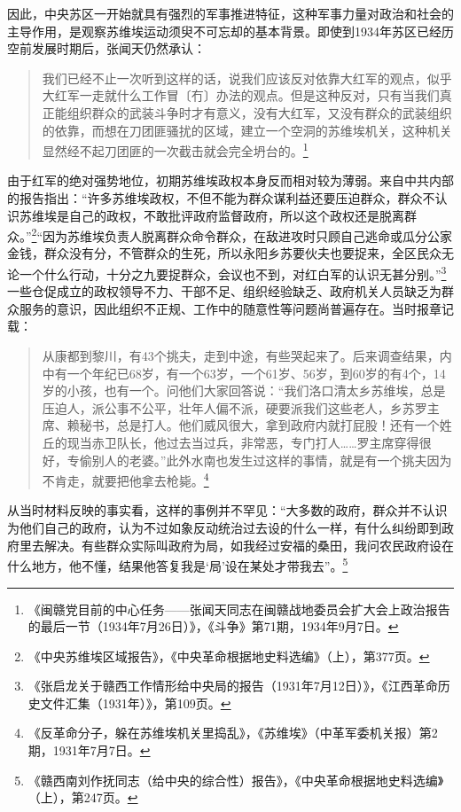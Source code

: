 因此，中央苏区一开始就具有强烈的军事推进特征，这种军事力量对政治和社会的主导作用，是观察苏维埃运动须臾不可忘却的基本背景。即使到1934年苏区已经历空前发展时期后，张闻天仍然承认：

\begin{quote}

我们已经不止一次听到这样的话，说我们应该反对依靠大红军的观点，似乎大红军一走就什么工作冒〔冇〕办法的观点。但是这种反对，只有当我们真正能组织群众的武装斗争时才有意义，没有大红军，又没有群众的武装组织的依靠，而想在刀团匪骚扰的区域，建立一个空洞的苏维埃机关，这种机关显然经不起刀团匪的一次截击就会完全坍台的。\footnote{《闽赣党目前的中心任务——张闻天同志在闽赣战地委员会扩大会上政治报告的最后一节（1934年7月26日）》，《斗争》第71期，1934年9月7日。}
\end{quote}


由于红军的绝对强势地位，初期苏维埃政权本身反而相对较为薄弱。来自中共内部的报告指出：“许多苏维埃政权，不但不能为群众谋利益还要压迫群众，群众不认识苏维埃是自己的政权，不敢批评政府监督政府，所以这个政权还是脱离群众。”\footnote{《中央苏维埃区域报告》，《中央革命根据地史料选编》（上），第377页。}“因为苏维埃负责人脱离群众命令群众，在敌进攻时只顾自己逃命或瓜分公家金钱，群众没有分，不管群众的生死，所以永阳乡苏要伙夫也要捉来，全区民众无论一个什么行动，十分之九要捉群众，会议也不到，对红白军的认识无甚分别。”\footnote{《张启龙关于赣西工作情形给中央局的报告（1931年7月12日）》，《江西革命历史文件汇集（1931年）》，第109页。}一些仓促成立的政权领导不力、干部不足、组织经验缺乏、政府机关人员缺乏为群众服务的意识，因此组织不正规、工作中的随意性等问题尚普遍存在。当时报章记载：

\begin{quote}

从康都到黎川，有43个挑夫，走到中途，有些哭起来了。后来调查结果，内中有一个年纪已68岁，有一个63岁，一个61岁、56岁，到60岁的有4个，14岁的小孩，也有一个。问他们大家回答说：“我们洛口清太乡苏维埃，总是压迫人，派公事不公平，壮年人偏不派，硬要派我们这些老人，乡苏罗主席、赖秘书，总是打人。他们威风很大，拿到政府内就打屁股！还有一个姓丘的现当赤卫队长，他过去当过兵，非常恶，专门打人……罗主席穿得很好，专偷别人的老婆。”此外水南也发生过这样的事情，就是有一个挑夫因为不肯走，就要把他拿去枪毙。\footnote{《反革命分子，躲在苏维埃机关里捣乱》，《苏维埃》（中革军委机关报）第2期，1931年7月7日。}
\end{quote}


从当时材料反映的事实看，这样的事例并不罕见：“大多数的政府，群众并不认识为他们自己的政府，认为不过如象反动统治过去设的什么一样，有什么纠纷即到政府里去解决。有些群众实际叫政府为局，如我经过安福的桑田，我问农民政府设在什么地方，他不懂，结果他答复我是‘局’设在某处才带我去”。\footnote{《赣西南刘作抚同志（给中央的综合性）报告》，《中央革命根据地史料选编》（上），第247页。}


